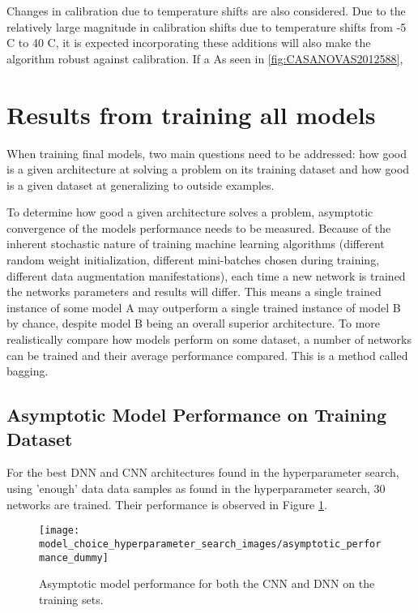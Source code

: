 Changes in calibration due to temperature shifts are also considered. Due to the relatively large magnitude in calibration shifts due to temperature shifts from -5 C to 40 C, it is expected incorporating these additions will also make the algorithm robust against calibration. If a As seen in \ref{fig:CASANOVAS2012588}, 




\section{Results from training all models}

When training final models, two main questions need to be addressed: how good is a given architecture at solving a problem on its training dataset and how good is a given dataset at generalizing to outside examples.

To determine how good a given architecture solves a problem, asymptotic convergence of the models performance needs to be measured. Because of the inherent stochastic nature of training machine learning algorithms (different random weight initialization, different mini-batches chosen during training, different data augmentation manifestations), each time a new network is trained the networks parameters and results will differ. This means a single trained instance of some model A may outperform a single trained instance of model B by chance, despite model B being an overall superior architecture. To more realistically compare how models perform on some dataset, a number of networks can be trained and their average performance compared. This is a method called bagging.

\subsection{Asymptotic Model Performance on Training Dataset}

For the best DNN and CNN architectures found in the hyperparameter search, using 'enough' data data samples as found in the hyperparameter search, 30 networks are trained. Their performance is observed in Figure \ref{fig:asymptotic_performance}.


\begin{figure}[H]
	\centering
	\texttt{[image: model\_choice\_hyperparameter\_search\_images/asymptotic\_performance\_dummy]}
	\caption{Asymptotic model performance for both the CNN and DNN on the training sets.}
	\label{fig:asymptotic_performance}
\end{figure}

